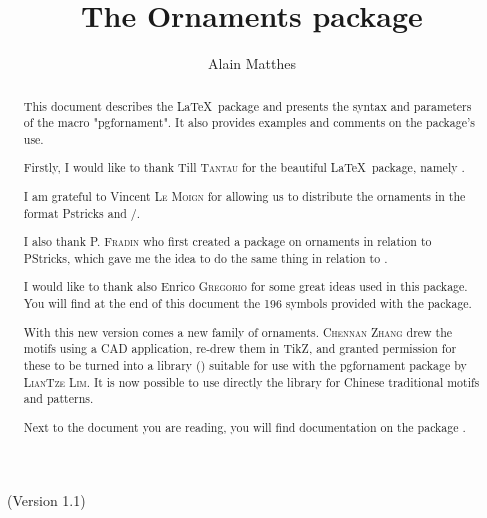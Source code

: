 \documentclass[a4paper,nofonts]{tufte-handout}
\title{The Ornaments package}
\author{Alain Matthes}
\begin{document}
\maketitle
\noindent{}
\begin{marginfigure}
\end{marginfigure}


\bigskip
\noindent{}\ (Version  1.1)
\begin{abstract}

This document describes the \LaTeX\ package \emph{} and presents the syntax and parameters of the macro "pgfornament".
It also provides examples and comments on the package's use.

 Firstly, I would like to thank {Till \textsc{Tantau}} for the  beautiful \LaTeX\ package, namely \TIKZ.

I am grateful to  Vincent \textsc{Le Moign} for allowing us to distribute the ornaments  in the format Pstricks and \PGF/\TIKZ.

I also thank \textsc{P. Fradin} who first created a package on ornaments in relation to PStricks, which gave me the idea to do the same thing in relation to \TIKZ.

I would like to thank also {Enrico  \textsc{Gregorio}} for some great ideas used in this package. You will find at the end of this document the 196 symbols provided with the package.

With this new version comes a new family of ornaments.
\textsc{Chennan Zhang} drew the motifs using a CAD application, re-drew them in TikZ, and granted permission for these to be turned into a library (\emph{}) suitable for use with the pgfornament package by \textsc{LianTze Lim}.
It is now possible to use directly the library for Chinese traditional motifs and patterns.

Next to the document you are reading, you will find documentation on the package \emph{}.
\end{abstract}

\vspace{1cm}
\hfil  {}\hfil
\end{document}
